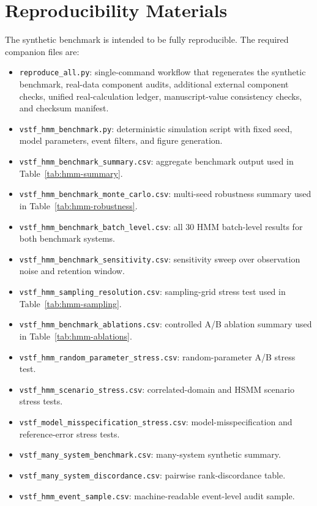 \documentclass[11pt,a4paper]{article}
\newcommand{\1}{\mathbf{1}}
\begin{document}
\section{Reproducibility Materials}

The synthetic benchmark is intended to be fully reproducible. The required companion files are:
\begin{itemize}
  \item \texttt{reproduce\_all.py}: single-command workflow that regenerates the synthetic benchmark, real-data component audits, additional external component checks, unified real-calculation ledger, manuscript-value consistency checks, and checksum manifest.
  \item \texttt{vstf\_hmm\_benchmark.py}: deterministic simulation script with fixed seed, model parameters, event filters, and figure generation.
  \item \texttt{vstf\_hmm\_benchmark\_summary.csv}: aggregate benchmark output used in Table~\ref{tab:hmm-summary}.
  \item \texttt{vstf\_hmm\_benchmark\_monte\_carlo.csv}: multi-seed robustness summary used in Table~\ref{tab:hmm-robustness}.
  \item \texttt{vstf\_hmm\_benchmark\_batch\_level.csv}: all 30 HMM batch-level results for both benchmark systems.
  \item \texttt{vstf\_hmm\_benchmark\_sensitivity.csv}: sensitivity sweep over observation noise and retention window.
  \item \texttt{vstf\_hmm\_sampling\_resolution.csv}: sampling-grid stress test used in Table~\ref{tab:hmm-sampling}.
  \item \texttt{vstf\_hmm\_benchmark\_ablations.csv}: controlled A/B ablation summary used in Table~\ref{tab:hmm-ablations}.
  \item \texttt{vstf\_hmm\_random\_parameter\_stress.csv}: random-parameter A/B stress test.
  \item \texttt{vstf\_hmm\_scenario\_stress.csv}: correlated-domain and HSMM scenario stress tests.
  \item \texttt{vstf\_model\_misspecification\_stress.csv}: model-misspecification and reference-error stress tests.
  \item \texttt{vstf\_many\_system\_benchmark.csv}: many-system synthetic summary.
  \item \texttt{vstf\_many\_system\_discordance.csv}: pairwise rank-discordance table.
  \item \texttt{vstf\_hmm\_event\_sample.csv}: machine-readable event-level audit sample.

\end{itemize}
\end{document}
